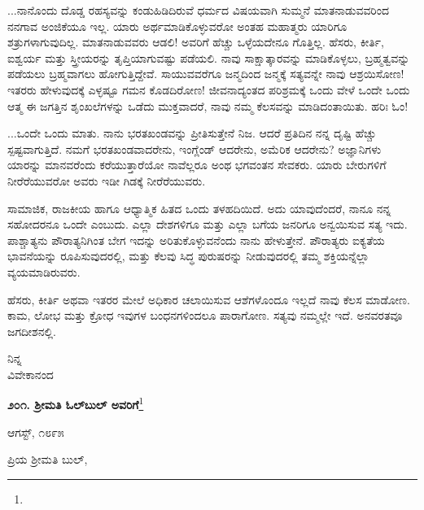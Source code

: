 \eject

...ನಾನೊಂದು ದೊಡ್ಡ ರಹಸ್ಯವನ್ನು ಕಂಡುಹಿಡಿದಿರುವೆ\enginline{-} ಧರ್ಮದ ವಿಷಯವಾಗಿ ಸುಮ್ಮನೆ ಮಾತನಾಡುವವರಿಂದ ನನಗಾವ ಅಂಜಿಕೆಯೂ ಇಲ್ಲ. ಯಾರು ಅರ್ಥಮಾಡಿಕೊಳ್ಳುವರೋ ಅಂತಹ ಮಹಾತ್ಮರು ಯಾರಿಗೂ ಶತ್ರುಗಳಾಗುವುದಿಲ್ಲ. ಮಾತನಾಡುವವರು ಆಡಲಿ! ಅವರಿಗೆ ಹೆಚ್ಚು ಒಳ್ಳೆಯದೇನೂ ಗೊತ್ತಿಲ್ಲ. ಹೆಸರು, ಕೀರ್ತಿ, ಐಶ್ವರ್ಯ ಮತ್ತು ಸ್ತ್ರೀಯರನ್ನು ತೃಪ್ತಿಯಾಗುವಷ್ಟು ಪಡೆಯಲಿ. ನಾವು ಸಾಕ್ಷಾತ್ಕಾರವನ್ನು ಮಾಡಿಕೊಳ್ಳಲು, ಬ್ರಹ್ಮತ್ವವನ್ನು ಪಡೆಯಲು ಬ್ರಹ್ಮವಾಗಲು ಹೋಗುತ್ತಿದ್ದೇವೆ. ಸಾಯುವವರೆಗೂ ಜನ್ಮದಿಂದ ಜನ್ಮಕ್ಕೆ ಸತ್ಯವನ್ನೇ ನಾವು ಆಶ್ರಯಿಸೋಣ! ಇತರರು ಹೇಳುವುದಕ್ಕೆ ಎಳ್ಳಷ್ಟೂ ಗಮನ ಕೊಡದಿರೋಣ! ಜೀವನಾದ್ಯಂತದ ಪರಿಶ್ರಮಕ್ಕೆ ಒಂದು 
ವೇಳೆ ಒಂದೇ ಒಂದು ಆತ್ಮ ಈ ಜಗತ್ತಿನ ಶೃಂಖಲೆಗಳನ್ನು ಒಡೆದು ಮುಕ್ತವಾದರೆ, ನಾವು ನಮ್ಮ ಕೆಲಸವನ್ನು ಮಾಡಿದಂತಾಯಿತು. ಹರಿಃ ಓಂ!

\vspace{0.15cm}

...ಒಂದೇ ಒಂದು ಮಾತು. ನಾನು ಭರತಖಂಡವನ್ನು ಪ್ರೀತಿಸುತ್ತೇನೆ ನಿಜ. ಆದರೆ ಪ್ರತಿದಿನ ನನ್ನ ದೃಷ್ಟಿ ಹೆಚ್ಚು ಸ್ಪಷ್ಟವಾಗುತ್ತಿದೆ. ನಮಗೆ ಭರತಖಂಡವಾದರೇನು, ಇಂಗ್ಲೆಂಡ್ ಆದರೇನು, ಅಮೆರಿಕ ಆದರೇನು? ಅಜ್ಞಾನಿಗಳು ಯಾರನ್ನು ಮಾನವರೆಂದು ಕರೆಯುತ್ತಾರೆಯೋ ನಾವೆಲ್ಲರೂ ಅಂಥ ಭಗವಂತನ ಸೇವಕರು. ಯಾರು ಬೇರುಗಳಿಗೆ ನೀರೆರೆಯುವರೋ ಅವರು ಇಡೀ ಗಿಡಕ್ಕೆ ನೀರೆರೆಯುವರು.

\vspace{0.15cm}

ಸಾಮಾಜಿಕ, ರಾಜಕೀಯ ಹಾಗೂ ಆಧ್ಯಾತ್ಮಿಕ ಹಿತದ ಒಂದು ತಳಹದಿಯಿದೆ. ಅದು ಯಾವುದೆಂದರೆ, ನಾನೂ ನನ್ನ ಸಹೋದರನೂ ಒಂದೇ ಎಂಬುದು. ಎಲ್ಲಾ ದೇಶಗಳಿಗೂ ಮತ್ತು ಎಲ್ಲಾ ಬಗೆಯ ಜನರಿಗೂ ಅನ್ವಯಿಸುವ ಸತ್ಯ ಇದು. ಪಾಶ್ಚಾತ್ಯನು ಪೌರಾತ್ಯನಿಗಿಂತ ಬೇಗ ಇದನ್ನು ಅರಿತುಕೊಳ್ಳುವನೆಂದು ನಾನು ಹೇಳುತ್ತೇನೆ. ಪೌರಾತ್ಯರು ಐಕ್ಯತೆಯ ಭಾವನೆಯನ್ನು ರೂಪಿಸುವುದರಲ್ಲಿ, ಮತ್ತು ಕೆಲವು ಸಿದ್ಧ ಪುರುಷರನ್ನು ನೀಡುವುದರಲ್ಲಿ ತಮ್ಮ ಶಕ್ತಿಯನ್ನೆಲ್ಲಾ ವ್ಯಯಮಾಡಿರುವರು.

\vspace{0.15cm}

ಹೆಸರು, ಕೀರ್ತಿ ಅಥವಾ ಇತರರ ಮೇಲೆ ಅಧಿಕಾರ ಚಲಾಯಿಸುವ ಆಶೆಗಳೊಂದೂ ಇಲ್ಲದೆ ನಾವು ಕೆಲಸ ಮಾಡೋಣ. ಕಾಮ, ಲೋಭ ಮತ್ತು ಕ್ರೋಧ ಇವುಗಳ ಬಂಧನಗಳಿಂದಲೂ ಪಾರಾಗೋಣ. ಸತ್ಯವು ನಮ್ಮಲ್ಲೇ ಇದೆ. ಅನವರತವೂ ಜಗದೀಶನಲ್ಲಿ.

{\flushright
ನಿನ್ನ\\ವಿವೇಕಾನಂದ\par}

\newpage

\begin{center}
\textbf{೨೦೧. ಶ‍್ರೀಮತಿ ಓಲ್‌ಬುಲ್‌ ಅವರಿಗೆ}\footnote{}
\end{center}

\begin{flushright}
ಆಗಸ್ಟ್, ೧೮೯೫
\end{flushright}

\noindent
ಪ್ರಿಯ ಶ‍್ರೀಮತಿ ಬುಲ್,

